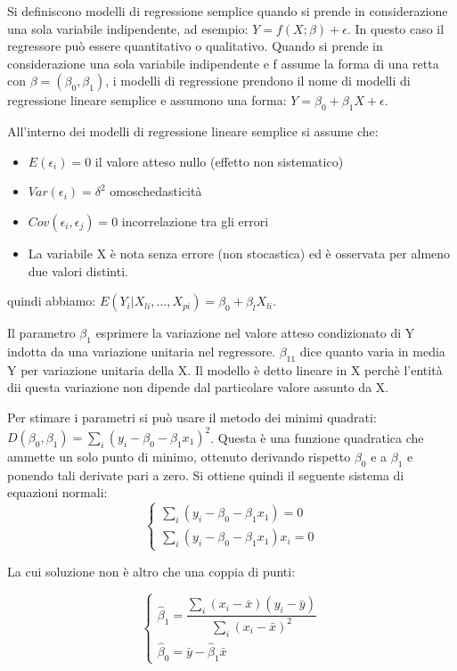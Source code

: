 \documentclass[a4paper]{extarticle}
\begin{document}
Si definiscono modelli di regressione semplice quando si prende in considerazione una sola variabile indipendente, ad esempio: $ Y = f(X; \beta) +\epsilon$. In questo caso il regressore può essere quantitativo o qualitativo. Quando si prende in considerazione una sola variabile indipendente e f assume la forma di una retta con $\beta = (\beta_0,\beta_1)$, i modelli di regressione prendono il nome di modelli di regressione lineare semplice e assumono una forma: $Y = \beta_0 + \beta_1 X + \epsilon$.

All'interno dei modelli di regressione lineare semplice si assume che:
\begin{itemize}
\item $E(\epsilon_i) = 0$ il valore atteso nullo (effetto non sistematico)
\item $Var(\epsilon_i) = \delta^2$ omoschedasticità
\item $Cov(\epsilon_i,\epsilon_j)=0$ incorrelazione tra gli errori 
\item La variabile X è nota senza errore (non stocastica) ed è osservata per almeno due valori distinti.
\end{itemize}

quindi abbiamo: $E(Y_i | X_{li},\dots,X_{pi}) = \beta_0 + \beta_l X_{li}$.

Il parametro $\beta_1$ esprimere la variazione nel valore atteso condizionato di Y indotta da una variazione unitaria nel regressore. $\beta_11$ dice quanto varia in media Y per variazione unitaria della X. Il modello è detto lineare in X perchè l'entità dii questa variazione non dipende dal particolare valore assunto da X.

Per stimare i parametri si può usare il metodo dei minimi quadrati: $D(\beta_0,\beta_1) = \sum\limits_i (y_i - \beta_0 - \beta_1x_1)^2$. Questa è una funzione quadratica che ammette  un solo punto di minimo, ottenuto derivando rispetto $\beta_0$ e a $\beta_1$ e ponendo tali derivate pari a zero. Si ottiene quindi il seguente sistema di equazioni normali:
\begin{equation*}
\begin{cases}
		\sum\limits_i(y_i-\beta_0 - \beta_1x_1) = 0\\
		\sum\limits_i(y_i-\beta_0 - \beta_1x_1)x_i = 0
	\end{cases}
\end{equation*}

La cui soluzione non è altro che una coppia di punti:

\begin{equation*}
\begin{cases}
		\hat \beta_1 = \dfrac{\sum\limits_i(x_i-\bar x)(y_i - \bar y)}{\sum\limits_i(x_i-\bar x)^2}\\
		\hat \beta_0 = \bar y - \hat \beta_1 \bar x
	\end{cases}
\end{equation*}
\end{document}
